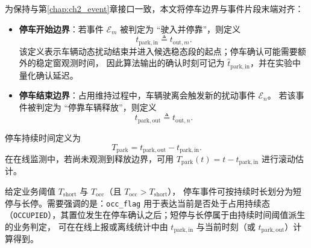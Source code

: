 \documentclass{xdupgthesis}
\begin{document}
为保持与第\ref{chap:ch2_event}章接口一致，本文将停车边界与事件片段末端对齐：
\begin{itemize}
  \item \textbf{停车开始边界}：若事件 $\mathcal{E}_{m}$ 被判定为 ``驶入并停靠''，则定义
  \begin{equation}
  t_{\mathrm{park,in}} \triangleq t_{\mathrm{out},m}.
  \end{equation}
  该定义表示车辆动态扰动结束并进入候选稳态段的起点；停车确认可能需要额外的稳定窗观测时间，
  因此算法输出的确认时刻可记为 $\hat{t}_{\mathrm{park,in}}$，并在实验中量化确认延迟。
  \item \textbf{停车结束边界}：占用维持过程中，车辆驶离会触发新的扰动事件 $\mathcal{E}_{n}$。
  若该事件被判定为 ``停靠车辆释放''，则定义
  \begin{equation}
  t_{\mathrm{park,out}} \triangleq t_{\mathrm{out},n}.
  \end{equation}
\end{itemize}
停车持续时间定义为
\begin{equation}
T_{\mathrm{park}} = t_{\mathrm{park,out}} - t_{\mathrm{park,in}}.
\label{eq:ch4_Tpark}
\end{equation}
在在线监测中，若尚未观测到释放边界，可用 $T_{\mathrm{park}}(t)=t-t_{\mathrm{park,in}}$ 进行滚动估计。

给定业务阈值 $T_{\mathrm{short}}$ 与 $T_{\mathrm{occ}}$（且 $T_{\mathrm{occ}} > T_{\mathrm{short}}$），
停车事件可按持续时长划分为短停与长停。需要强调的是：\texttt{occ\_flag} 用于表达当前是否处于占用持续态
（\texttt{OCCUPIED}），其置位发生在停车确认之后；短停与长停属于由持续时间阈值派生的业务判定，
可在在线上报或离线统计中由 $t_{\mathrm{park,in}}$ 与当前时刻（或 $t_{\mathrm{park,out}}$）计算得到。
\end{document}
